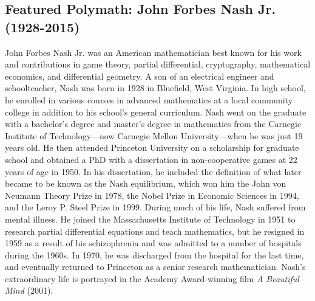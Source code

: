 \documentclass[12pt]{article}
\theoremstyle{definition}
\begin{document}
\subsection*{Featured Polymath: John Forbes Nash Jr. (1928-2015)}
John Forbes Nash Jr. was an American mathematician best known for his work and contributions in game theory, partial differential, cryptography, mathematical economics, and differential geometry. A son of an electrical engineer and schoolteacher, Nash was born in 1928 in Bluefield, West Virginia. In high school, he enrolled in various courses in advanced mathematics at a local community college in addition to his school’s general curriculum. Nash went on the graduate with a bachelor’s degree and master’s degree in mathematics from the Carnegie Institute of Technology—now Carnegie Mellon University—when he was just 19 years old. He then attended Princeton University on a scholarship for graduate school and obtained a PhD with a dissertation in non-cooperative games at 22 years of age in 1950. In his dissertation, he included the definition of what later became to be known as the Nash equilibrium, which won him the John von Neumann Theory Prize in 1978, the Nobel Prize in Economic Sciences in 1994, and the Leroy P. Steel Prize in 1999. During much of his life, Nash suffered from mental illness. He joined the Massachusetts Institute of Technology in 1951 to research partial differential equations and teach mathematics, but he resigned in 1959 as a result of his schizophrenia and was admitted to a number of hospitals during the 1960s. In 1970, he was discharged from the hospital for the last time, and eventually returned to Princeton as a senior research mathematician. Nash’s extraordinary life is portrayed in the Academy Award-winning film \emph{A Beautiful Mind} (2001).
\newpage


\def\currentTitleWallpaper{2020_Pure_Math_Title_Page_Border.pdf}



\newpage



\newpage



\newpage


\end{document}
